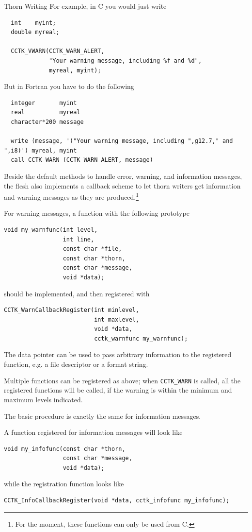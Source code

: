 \begin{cactuspart}{Thorn Writing}
For example, in C you would just write
\begin{verbatim}
  int    myint;
  double myreal;

  CCTK_VWARN(CCTK_WARN_ALERT,
             "Your warning message, including %f and %d",
             myreal, myint);
\end{verbatim}

But in Fortran you have to do the following
\begin{verbatim}
  integer       myint
  real          myreal
  character*200 message

  write (message, '("Your warning message, including ",g12.7," and ",i8)') myreal, myint
  call CCTK_WARN (CCTK_WARN_ALERT, message)
\end{verbatim}

Beside the default methods to handle error, warning, and information
messages, the flesh also implements a callback scheme to let thorn
writers get information and warning messages as they are produced.\footnote{For the moment, these
functions can only be used from C.}

For warning messages, a function with the following prototype
\begin{verbatim}
void my_warnfunc(int level,
                 int line,
                 const char *file,
                 const char *thorn,
                 const char *message,
                 void *data);
\end{verbatim}
should be implemented, and then registered with 
\begin{verbatim}
CCTK_WarnCallbackRegister(int minlevel,
                          int maxlevel,
                          void *data,
                          cctk_warnfunc my_warnfunc);
\end{verbatim}

The data pointer can be used to pass arbitrary information to the
registered function, e.g. a file descriptor or a format string.

Multiple functions can be registered as above; when
\texttt{CCTK\_WARN} is called, all the registered functions will be
called, if the warning is within the minimum and maximum levels
indicated.

The basic procedure is exactly the same for information messages.

A function registered for information messages will look like
\begin{verbatim}
void my_infofunc(const char *thorn,
                 const char *message,
                 void *data);
\end{verbatim}
while the registration function looks like 
\begin{verbatim}
CCTK_InfoCallbackRegister(void *data, cctk_infofunc my_infofunc);
\end{verbatim}


\end{cactuspart}
